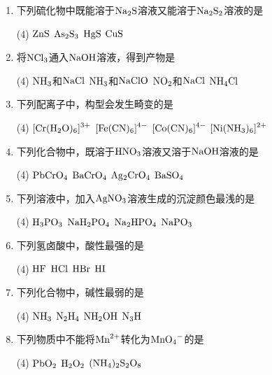 \begin{enumerate}[label=\arabic*., itemsep=1.5ex]
    \item 下列硫化物中既能溶于$\ce{Na2S}$溶液又能溶于$\ce{Na2S2}$溶液的是
    \begin{tasks}(4)
        \task $\ce{ZnS}$
        \task $\ce{As2S3}$
        \task $\ce{HgS}$
        \task $\ce{CuS}$
    \end{tasks}
    \item 将$\ce{NCl3}$通入$\ce{NaOH}$溶液，得到产物是
    \begin{tasks}(4)
        \task $\ce{NH3}$和$\ce{NaCl}$
        \task $\ce{NH3}$和$\ce{NaClO}$
        \task $\ce{NO2}$和$\ce{NaCl}$
        \task $\ce{NH4Cl}$
    \end{tasks}
    \item 下列配离子中，构型会发生畸变的是
    \begin{tasks}(4)
        \task $\ce{[Cr(H2O)6]^3+}$
        \task $\ce{[Fe(CN)6]^4-}$
        \task $\ce{[Co(CN)6]^4-}$
        \task $\ce{[Ni(NH3)6]^2+}$
    \end{tasks}
    \item 下列化合物中，既溶于$\ce{HNO3}$溶液又溶于$\ce{NaOH}$溶液的是
    \begin{tasks}(4)
        \task $\ce{PbCrO4}$
        \task $\ce{BaCrO4}$
        \task $\ce{Ag2CrO4}$
        \task $\ce{BaSO4}$
    \end{tasks}
    \item 下列溶液中，加入$\ce{AgNO3}$溶液生成的沉淀颜色最浅的是
    \begin{tasks}(4)
        \task $\ce{H3PO3}$
        \task $\ce{NaH2PO4}$
        \task $\ce{Na2HPO4}$
        \task $\ce{NaPO3}$
    \end{tasks}
    \item 下列氢卤酸中，酸性最强的是
    \begin{tasks}(4)
        \task $\ce{HF}$
        \task $\ce{HCl}$
        \task $\ce{HBr}$
        \task $\ce{HI}$
    \end{tasks}
    \item 下列化合物中，碱性最弱的是
    \begin{tasks}(4)
        \task $\ce{NH3}$
        \task $\ce{N2H4}$
        \task $\ce{NH2OH}$
        \task $\ce{N3H}$
    \end{tasks}
    \item 下列物质中不能将$\ce{Mn^2+}$转化为$\ce{MnO4^-}$的是
    \begin{tasks}(4)
        \task $\ce{PbO2}$
        \task $\ce{H2O2}$
        \task $\ce{(NH4)2S2O8}$

\end{tasks}
\end{enumerate}
